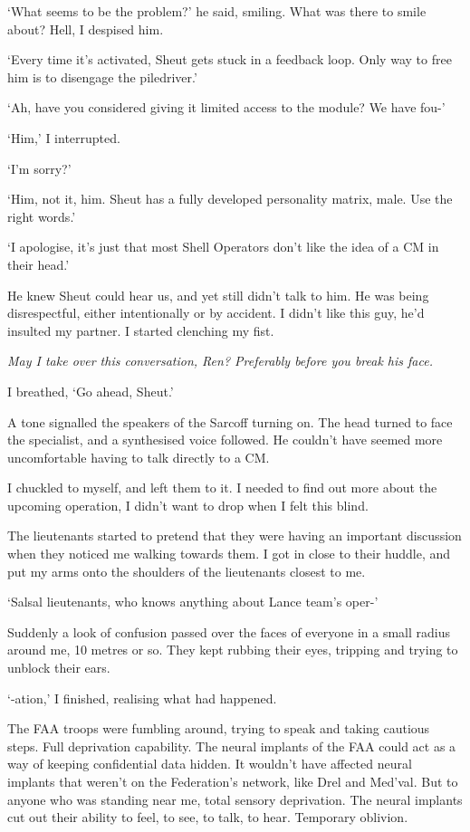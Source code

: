 `What seems to be the problem?' he said, smiling. What was there to smile about? Hell, I despised him.

`Every time it's activated, Sheut gets stuck in a feedback loop. Only way to free him is to disengage the piledriver.'

`Ah, have you considered giving it limited access to the module? We have fou-'

`Him,' I interrupted.

`I'm sorry?'

`Him, not it, him. Sheut has a fully developed personality matrix, male. Use the right words.'

`I apologise, it's just that most Shell Operators don't like the idea of a CM in their head.'

He knew Sheut could hear us, and yet still didn't talk to him. He was being disrespectful, either intentionally or by accident. I didn't like this guy, he'd insulted my partner. I started clenching my fist.

{\it May I take over this conversation, Ren? Preferably before you break his face.}

I breathed, `Go ahead, Sheut.'

A tone signalled the speakers of the Sarcoff turning on. The head turned to face the specialist, and a synthesised voice followed. He couldn't have seemed more uncomfortable having to talk directly to a CM. 

I chuckled to myself, and left them to it. I needed to find out more about the upcoming operation, I didn't want to drop when I felt this blind.

The lieutenants started to pretend that they were having an important discussion when they noticed me walking towards them. I got in close to their huddle, and put my arms onto the shoulders of the lieutenants closest to me.

`Salsal lieutenants, who knows anything about Lance team's oper-'

Suddenly a look of confusion passed over the faces of everyone in a small radius around me, 10 metres or so. They kept rubbing their eyes, tripping and trying to unblock their ears.

`-ation,' I finished, realising what had happened.

The FAA troops were fumbling around, trying to speak and taking cautious steps. Full deprivation capability. The neural implants of the FAA could act as a way of keeping confidential data hidden. It wouldn't have affected neural implants that weren't on the Federation's network, like Drel and Med'val. But to anyone who was standing near me, total sensory deprivation. The neural implants cut out their ability to feel, to see, to talk, to hear. Temporary oblivion.

